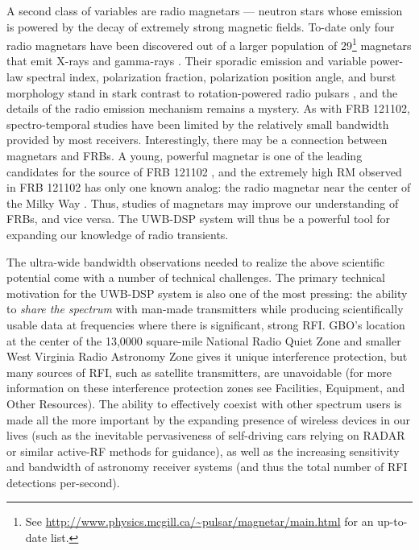 \documentclass[10pt]{myNSF}
\begin{document}
A second class of variables are radio magnetars --- neutron stars
whose emission is powered by the decay of extremely strong magnetic
fields.  To-date only four radio magnetars have been discovered out of
a larger population of 29\footnote{See
  \url{http://www.physics.mcgill.ca/~pulsar/magnetar/main.html} for an
  up-to-date list.} magnetars that emit X-rays and gamma-rays
\citep{crh+06,crh+07,lbb+10,efk+13}.  Their sporadic emission and
variable power-law spectral index, polarization fraction, polarization
position angle, and burst morphology stand in stark contrast to
rotation-powered radio pulsars \citep[e.g.][]{crp+07}, and the details
of the radio emission mechanism remains a mystery.  As with FRB
121102, spectro-temporal studies have been limited by the relatively
small bandwidth provided by most receivers.  Interestingly, there may
be a connection between magnetars and FRBs.  A young, powerful
magnetar is one of the leading candidates for the source of FRB 121102
\citep[e.g.][]{mm18}, and the extremely high RM observed in FRB 121102
has only one known analog: the radio magnetar near the center of the
Milky Way \citep{efk+13}.  Thus, studies of magnetars may improve our
understanding of FRBs, and vice versa.  The UWB-DSP system will thus
be a powerful tool for expanding our knowledge of radio transients.


\label{sec:technical_motivation}

The ultra-wide bandwidth observations needed to realize the above
scientific potential come with a number of technical challenges.  The
primary technical motivation for the UWB-DSP system is also one of the
most pressing: the ability to \emph{share the spectrum} with man-made
transmitters while producing scientifically usable data at frequencies
where there is significant, strong RFI.  GBO's location at the center
of the 13,0000 square-mile National Radio Quiet Zone and smaller West
Virginia Radio Astronomy Zone gives it unique interference protection,
but many sources of RFI, such as satellite transmitters, are
unavoidable (for more information on these interference protection
zones see Facilities, Equipment, and Other Resources).  The ability to
effectively coexist with other spectrum users is made all the more
important by the expanding presence of wireless devices in our lives
(such as the inevitable pervasiveness of self-driving cars relying on
RADAR or similar active-RF methods for guidance), as well as the
increasing sensitivity and bandwidth of astronomy receiver systems
(and thus the total number of RFI detections per-second).
\end{document}
